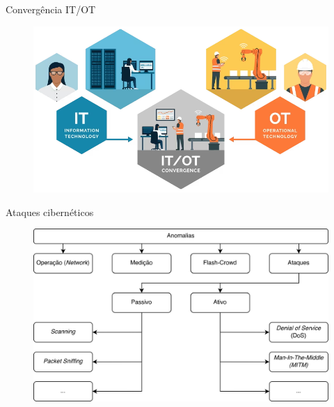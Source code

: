\documentclass{uspBeamer}
\begin{document}
    \begin{frame}{Convergência IT/OT}
        \begin{figure}
            \includegraphics[width=.8\textwidth]{convergenceitot.png}
        \end{figure}
    \end{frame}

    \begin{frame}{Ataques cibernéticos}
        \begin{figure}
            \includegraphics[height=.85\textheight]{anomalies.png}
        \end{figure}
    \end{frame}
\end{document}
